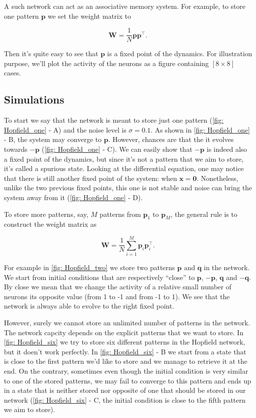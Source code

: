A such network can act as an associative memory system. For example, to store
one pattern $\mathbf{p}$ we set the weight matrix to 

\[\mathbf{W} = \frac{1}{N} \mathbf{p}\mathbf{p}^{\top}.\]

\noindent
Then it's quite easy to see that $\mathbf{p}$ is a fixed point of the
dynamics. For illustration purpose, we'll plot the activity of the neurons
as a figure containing $[8 \times 8]$ cases.

\subsection{Simulations}

To start we say that the network is meant to store just one pattern 
(\autoref{fig: Hopfield_one} - \textsf{A}) and the
noise level is $\sigma = 0.1$. As shown in \autoref{fig: Hopfield_one} -
\textsf{B}, the system may converge to $\mathbf{p}$. However, chances are 
that the it evolves towards $-\mathbf{p}$ 
(\autoref{fig: Hopfield_one} - \textsf{C}). We can easily show
that $-\mathbf{p}$ is indeed also a fixed point of the dynamics, but since
it's not a pattern that we aim to store, it's called a spurious state.
Looking at the differential equation, one may notice that there is still
another fixed point of the system: when $\mathbf{x} = \mathbf{0}$. 
Nonetheless, unlike the two previous fixed points, this one is not stable
and noise can bring the system away from it (\autoref{fig: Hopfield_one} -
\textsf{D}).

To store more patterns, say, $M$ patterns from $\mathbf{p}_1$ to 
$\mathbf{p}_M$, the general rule is to construct the weight matrix as

\[\mathbf{W} = \frac{1}{N} \sum_{i=1}^M \mathbf{p}_i\mathbf{p}_i^{\top}.\]

\noindent
For example in \autoref{fig: Hopfield_two} we store two patterns $\mathbf{p}$
and $\mathbf{q}$ in the network. We start from 
initial conditions that are respectively ``close'' to $\mathbf{p}$,
$-\mathbf{p}$, $\mathbf{q}$ and $-\mathbf{q}$. By close we mean that we change
the activity of a relative small number of neurons its opposite value 
(from 1 to -1 and from -1 to 1). We see that the network is always able
to evolve to the right fixed point.

However, surely we cannot store an unlimited number of patterns in the 
network. The network capcity depends on the explicit patterns that we want
to store. In \autoref{fig: Hopfield_six} we try to store six different 
patterns in the Hopfield network, but it doen't work perfectly.
In \autoref{fig: Hopfield_six} - \textsf{B} we start from a state that is
close to the first pattern we'd like to store and we manage to retrieve it
at the end. On the contrary, sometimes even though the initial condition 
is very similar to one of the stored patterns, we may fail to converge to 
this pattern and ends up in a state that is neither stored nor opposite of 
one that should be stored in our network (\autoref{fig: Hopfield_six} -
\textsf{C}, the initial condition is close to the fifth pattern we aim to
store).


